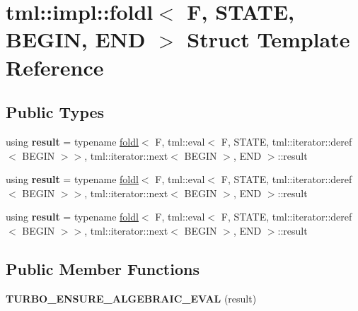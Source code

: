\hypertarget{structtml_1_1impl_1_1foldl_3_01F_00_01STATE_00_01BEGIN_00_01END_01_4}{\section{tml\+:\+:impl\+:\+:foldl$<$ F, S\+T\+A\+T\+E, B\+E\+G\+I\+N, E\+N\+D $>$ Struct Template Reference}
\label{structtml_1_1impl_1_1foldl_3_01F_00_01STATE_00_01BEGIN_00_01END_01_4}
}
\subsection*{Public Types}
\begin{DoxyCompactItemize}
\item 
\hypertarget{structtml_1_1impl_1_1foldl_3_01F_00_01STATE_00_01BEGIN_00_01END_01_4_a06ff0d75189aea2154c99458bfff3208}{using {\bfseries result} = typename \hyperlink{structtml_1_1impl_1_1foldl}{foldl}$<$ F, tml\+::eval$<$ F, S\+T\+A\+T\+E, tml\+::iterator\+::deref$<$ B\+E\+G\+I\+N $>$$>$, tml\+::iterator\+::next$<$ B\+E\+G\+I\+N $>$, E\+N\+D $>$\+::result}\label{structtml_1_1impl_1_1foldl_3_01F_00_01STATE_00_01BEGIN_00_01END_01_4_a06ff0d75189aea2154c99458bfff3208}

\item 
\hypertarget{structtml_1_1impl_1_1foldl_3_01F_00_01STATE_00_01BEGIN_00_01END_01_4_a06ff0d75189aea2154c99458bfff3208}{using {\bfseries result} = typename \hyperlink{structtml_1_1impl_1_1foldl}{foldl}$<$ F, tml\+::eval$<$ F, S\+T\+A\+T\+E, tml\+::iterator\+::deref$<$ B\+E\+G\+I\+N $>$$>$, tml\+::iterator\+::next$<$ B\+E\+G\+I\+N $>$, E\+N\+D $>$\+::result}\label{structtml_1_1impl_1_1foldl_3_01F_00_01STATE_00_01BEGIN_00_01END_01_4_a06ff0d75189aea2154c99458bfff3208}

\item 
\hypertarget{structtml_1_1impl_1_1foldl_3_01F_00_01STATE_00_01BEGIN_00_01END_01_4_a06ff0d75189aea2154c99458bfff3208}{using {\bfseries result} = typename \hyperlink{structtml_1_1impl_1_1foldl}{foldl}$<$ F, tml\+::eval$<$ F, S\+T\+A\+T\+E, tml\+::iterator\+::deref$<$ B\+E\+G\+I\+N $>$$>$, tml\+::iterator\+::next$<$ B\+E\+G\+I\+N $>$, E\+N\+D $>$\+::result}\label{structtml_1_1impl_1_1foldl_3_01F_00_01STATE_00_01BEGIN_00_01END_01_4_a06ff0d75189aea2154c99458bfff3208}

\end{DoxyCompactItemize}
\subsection*{Public Member Functions}
\begin{DoxyCompactItemize}
\item 
\hypertarget{structtml_1_1impl_1_1foldl_3_01F_00_01STATE_00_01BEGIN_00_01END_01_4_ae10f12aea576ff427f05a73a103df9a2}{{\bfseries T\+U\+R\+B\+O\+\_\+\+E\+N\+S\+U\+R\+E\+\_\+\+A\+L\+G\+E\+B\+R\+A\+I\+C\+\_\+\+E\+V\+A\+L} (result)}\label{structtml_1_1impl_1_1foldl_3_01F_00_01STATE_00_01BEGIN_00_01END_01_4_ae10f12aea576ff427f05a73a103df9a2}

\end{DoxyCompactItemize}



